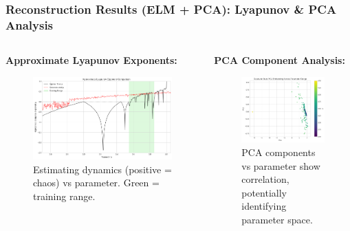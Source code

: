 \documentclass{beamer}
\begin{document}
\begin{frame}
    \frametitle{Reconstruction Results (ELM + PCA): Lyapunov & PCA Analysis}
    \begin{columns}[T]
        \begin{column}{0.5\textwidth}
            \textbf{Approximate Lyapunov Exponents:}
            \begin{figure}
                \includegraphics[width=\linewidth]{figures/lyapanov_bd_rd.png}
                \caption{Estimating dynamics (positive = chaos) vs parameter. Green = training range.}
                 \label{fig:lypanov_bd_rc_slide}
            \end{figure}
        \end{column}
        \begin{column}{0.5\textwidth}
            \textbf{PCA Component Analysis:}
             \begin{figure}
                \includegraphics[width=\linewidth]{figures/bd_elm_pca_analysis.png}
                \caption{PCA components vs parameter show correlation, potentially identifying parameter space.}
                 \label{fig:bd_4_slide}
            \end{figure}
        \end{column}
    \end{columns}
\end{frame}
\end{document}
